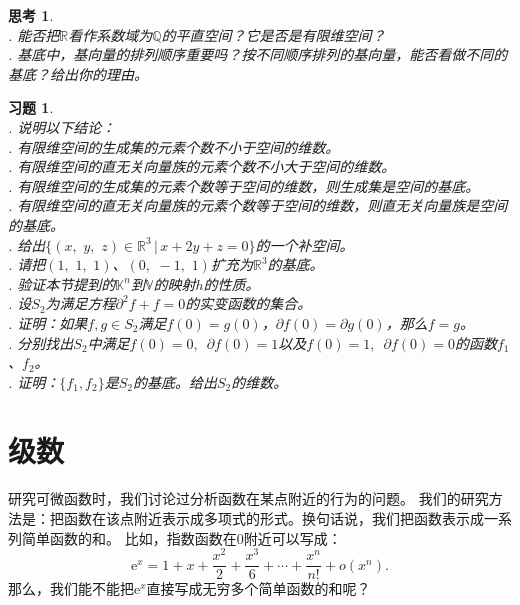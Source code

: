 \documentclass[12pt,UTF8]{ctexbook}
\newcommand{\olim}[1]{\mathit{o}\left(#1\right)}  %
\theoremstyle{definition}
\theoremstyle{plain}
\newtheorem{sk}{思考}[section]
\newtheorem{xt}{习题}[section]
\begin{document}
\begin{sk}
    \mbox{} \\
    . 能否把$\mathbb{R}$看作系数域为$\mathbb{Q}$的平直空间？它是否是有限维空间？\\
    . 基底中，基向量的排列顺序重要吗？按不同顺序排列的基向量，能否看做不同的基底？给出你的理由。
\end{sk}

\begin{xt}
    \mbox{} \\
    . 说明以下结论：\\
    . 有限维空间的生成集的元素个数不小于空间的维数。\\
    . 有限维空间的直无关向量族的元素个数不小大于空间的维数。\\
    . 有限维空间的生成集的元素个数等于空间的维数，则生成集是空间的基底。\\
    . 有限维空间的直无关向量族的元素个数等于空间的维数，则直无关向量族是空间的基底。\\
    . 给出$\{(x,\,\,y,\,\,z)\in\mathbb{R}^3 \, | \, x + 2y + z = 0 \}$的一个补空间。\\
    . 请把$(1,\,\,1, \,\,1)$、$(0,\,\, -1, \,\,1)$扩充为$\mathbb{R}^3$的基底。\\
    . 验证本节提到的$\mathbb{K}^n$到$\mathbb{V}$的映射$h$的性质。\\
    . 设$S_2$为满足方程$\partial^2 f + f = 0$的实变函数的集合。\\
    . 证明：如果$f,g\in S_2$满足$f(0) = g(0)$，$\partial f(0) = \partial g(0)$，那么$f = g$。\\
    . 分别找出$S_2$中满足$f(0) = 0, \,\,\, \partial f(0) = 1$以及$f(0) = 1, \,\,\, \partial f(0) = 0$的函数$f_1$、$f_2$。\\
    . 证明：$\{f_1, f_2\}$是$S_2$的基底。给出$S_2$的维数。
\end{xt}

\chapter{级数}
研究可微函数时，我们讨论过分析函数在某点附近的行为的问题。
我们的研究方法是：把函数在该点附近表示成多项式的形式。换句话说，我们把函数表示成一系列简单函数的和。
比如，指数函数在$0$附近可以写成：
$$\mathrm{e}^x = 1 + x + \frac{x^2}{2} + \frac{x^3}{6} + \cdots + \frac{x^n}{n!} + \olim{x^n}.$$
那么，我们能不能把$\mathrm{e}^x$直接写成无穷多个简单函数的和呢？
\end{document}
